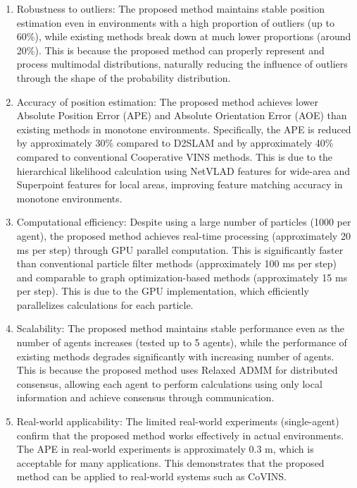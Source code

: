 \documentclass[a4paper,fleqn,10pt,twocolumn]{SICE_ISCS}
\begin{document}
\begin{enumerate}
\item Robustness to outliers:
   The proposed method maintains stable position estimation even in environments with a high proportion of outliers (up to 60\%), while existing methods break down at much lower proportions (around 20\%). This is because the proposed method can properly represent and process multimodal distributions, naturally reducing the influence of outliers through the shape of the probability distribution.

\item Accuracy of position estimation:
   The proposed method achieves lower Absolute Position Error (APE) and Absolute Orientation Error (AOE) than existing methods in monotone environments. Specifically, the APE is reduced by approximately 30\% compared to D2SLAM and by approximately 40\% compared to conventional Cooperative VINS methods. This is due to the hierarchical likelihood calculation using NetVLAD features for wide-area and Superpoint features for local areas, improving feature matching accuracy in monotone environments.

\item Computational efficiency:
   Despite using a large number of particles (1000 per agent), the proposed method achieves real-time processing (approximately 20 ms per step) through GPU parallel computation. This is significantly faster than conventional particle filter methods (approximately 100 ms per step) and comparable to graph optimization-based methods (approximately 15 ms per step). This is due to the GPU implementation, which efficiently parallelizes calculations for each particle.

\item Scalability:
   The proposed method maintains stable performance even as the number of agents increases (tested up to 5 agents), while the performance of existing methods degrades significantly with increasing number of agents. This is because the proposed method uses Relaxed ADMM for distributed consensus, allowing each agent to perform calculations using only local information and achieve consensus through communication.

\item Real-world applicability:
   The limited real-world experiments (single-agent) confirm that the proposed method works effectively in actual environments. The APE in real-world experiments is approximately 0.3 m, which is acceptable for many applications. This demonstrates that the proposed method can be applied to real-world systems such as CoVINS.
\end{enumerate}
\end{document}
